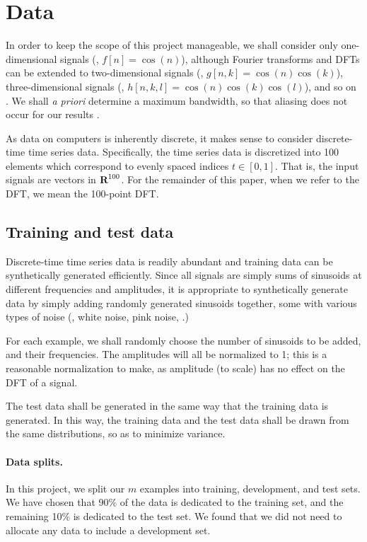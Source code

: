 \documentclass[12pt]{article}
\begin{document}
\section{Data}

In order to keep the scope of this project manageable, we shall consider only one-dimensional signals (\eg, 
$f[n] = \cos(n)$), although Fourier transforms and DFTs can be extended to two-dimensional signals 
(\eg, $g[n,k] = \cos(n)\cos(k)$), three-dimensional signals (\eg, $h[n,k,l] = \cos(n)\cos(k)\cos(l)$), and 
so on \cite{O:17}.
We shall \emph{a priori} determine a maximum bandwidth, so that aliasing does not occur for our results \cite{OS:99}.

As data on computers is inherently discrete, it makes sense to consider discrete-time time series data.
Specifically, the time series data is discretized into 100 elements which correspond to evenly spaced 
indices $t \in [0,1]$. That is, the input signals are vectors in ${\mbox{\bf R}}^{100}$. For the remainder of
this paper, when we refer to the DFT, we mean the 100-point DFT. 


\subsection{Training and test data} Discrete-time time series data is readily abundant and 
training data can be synthetically generated efficiently. Since all signals are simply sums of 
sinusoids at different frequencies and amplitudes, it is appropriate to synthetically generate
data by simply adding randomly generated sinusoids together, some with various types of noise 
(\eg, white noise, pink noise, \etc.)

For each example, we shall randomly choose the number of sinusoids 
to be added, and their frequencies. The amplitudes will all be normalized to 1; this is a reasonable 
normalization to make, as amplitude (to scale) has no effect on the DFT of a signal.

The test data shall be generated in the same way that the training data is
generated. In this way, the training data and the test data shall be drawn from the same distributions,
so as to minimize variance.

\paragraph{Data splits.} In this project, we split our $m$ examples into training, development, and test
sets. We have chosen that 90\% of the data is dedicated to the training set, and the remaining 10\% is 
dedicated to the test set. We found that we did not need to allocate any data to include a development set.
\end{document}
